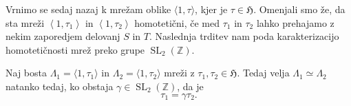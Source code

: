 \documentclass[mat1]{fmfdelo}
\numberwithin{equation}{section}
\newcommand{\Z}{\mathbb Z}
\newcommand{\HH}{\mathfrak{H}}
\newcommand{\SL}{\operatorname{SL}_2(\Z)}
\newcommand{\htp}{\simeq}
\newcommand{\lattice}[2]{\left\langle #1, #2 \right\rangle}
\theoremstyle{definition}
\begin{document}
Vrnimo se sedaj nazaj k mrežam oblike $\langle 1, \tau \rangle$, kjer je $\tau \in \HH$. Omenjali smo že, da sta mreži $\lattice{1}{\tau_1}$ in $\lattice{1}{\tau_2}$ homotetični, če med $\tau_1$ in $\tau_2$ lahko prehajamo z nekim zaporedjem delovanj $S$ in $T$. Naslednja trditev nam poda karakterizacijo homotetičnosti mrež preko grupe $\SL$.




\begin{trditev}
    \label{ekvivalentne normalizirane mreze}
    Naj bosta $\Lambda_1 = \langle 1, \tau_1 \rangle$ in $\Lambda_2 = \langle 1, \tau_2 \rangle$ mreži z $\tau_1, \tau_2 \in \HH$. Tedaj velja $\Lambda_1 \htp \Lambda_2$ natanko tedaj, ko obstaja $\gamma \in \SL$,  da je 
    \[
        \tau_1 = \gamma\tau_2.
    \]
\end{trditev}
\end{document}
